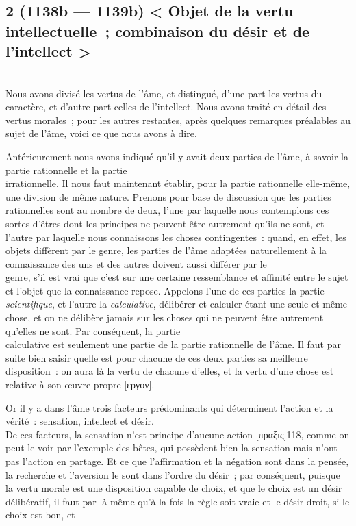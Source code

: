 \documentclass[french,twoside]{book} %
\begin{document}
\subsection[{2 (1138b — 1139b) < Objet de la vertu intellectuelle ; combinaison du désir et de l’intellect >}]{2 (1138b — 1139b) < Objet de la vertu intellectuelle ; combinaison du désir et de l’intellect >}
\noindent \\
Nous avons divisé les vertus de l’âme, et distingué, d’une  part les vertus du caractère, et d’autre part celles de l’intellect. Nous avons traité en détail des vertus morales ; pour les autres restantes, après quelques remarques préalables au sujet de l’âme, voici ce que nous avons à dire.\par
Antérieurement nous avons indiqué qu’il y avait deux parties de l’âme, à savoir la partie rationnelle et la partie \\
irrationnelle. Il nous faut maintenant établir, pour la partie rationnelle elle-même, une division de même nature. Prenons pour base de discussion que les parties rationnelles sont au nombre de deux, l’une par laquelle nous contemplons ces sortes d’êtres dont les principes ne peuvent être autrement qu’ils ne sont, et l’autre par laquelle nous connaissons les choses contingentes : quand, en effet, les objets diffèrent par le genre, les parties de l’âme adaptées naturellement à la connaissance des uns et des autres doivent aussi différer par le \\
genre, s’il est vrai que c’est sur une certaine ressemblance et affinité entre le sujet et l’objet que la connaissance repose. Appelons l’une de ces parties la partie {\itshape scientifique}, et l’autre la {\itshape calculative}, délibérer et calculer étant une seule et même chose, et on ne délibère jamais sur les choses qui ne peuvent être autrement qu’elles ne sont. Par conséquent, la partie \\
calculative est seulement une partie de la partie rationnelle de l’âme. Il faut par suite bien saisir quelle est pour chacune de ces deux parties sa meilleure disposition : on aura là la vertu de chacune d’elles, et la vertu d’une chose est relative à son œuvre propre [εργον].\par
Or il y a dans l’âme trois facteurs prédominants qui déterminent l’action et la vérité : sensation, intellect et désir. \\
De ces facteurs, la sensation n’est principe d’aucune action [πραξις]118, comme on peut le voir par l’exemple des bêtes, qui possèdent bien la sensation mais n’ont pas l’action en partage. Et ce que l’affirmation et la négation sont dans la pensée, la recherche et l’aversion le sont dans l’ordre du désir ; par conséquent, puisque la vertu morale est une disposition capable de choix, et que le choix est un désir délibératif, il faut par là même qu’à la fois la règle soit vraie et le désir droit, si le choix est bon, et \\
\end{document}
